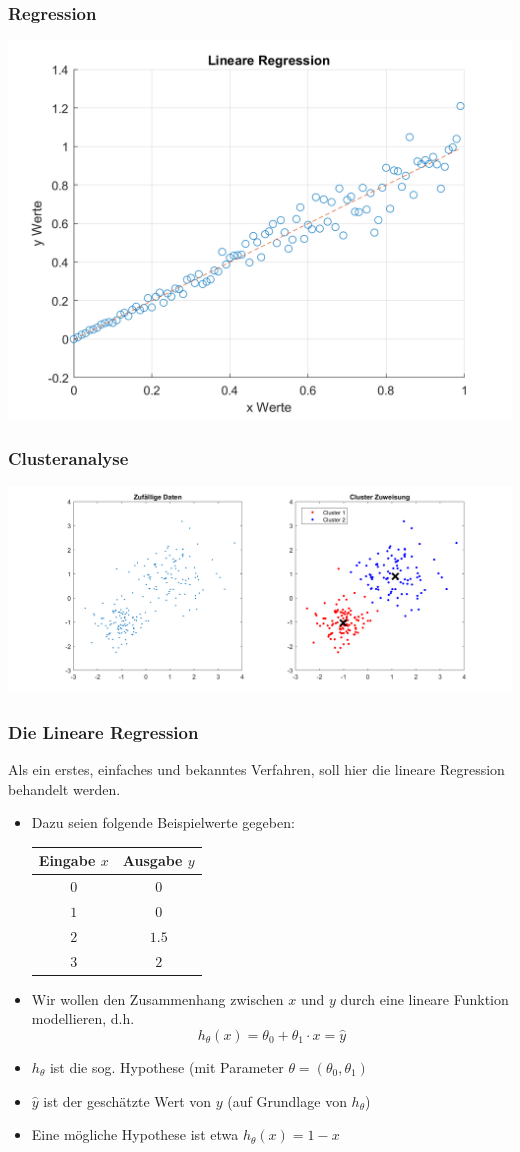 \begin{frame}
\frametitle{Regression}
\centering
\includegraphics[scale=0.31]{images/plot_linreg.png} 
\end{frame}
\begin{frame}
\frametitle{Clusteranalyse}
\includegraphics[scale=0.25]{images/cluster_plot.png} 
\end{frame}
\begin{frame}
\frametitle{Die Lineare Regression}
Als ein erstes, einfaches und bekanntes Verfahren, soll hier die lineare Regression behandelt werden.
\pause
\begin{itemize}[<+->]
\item Dazu seien folgende Beispielwerte gegeben:\\
\begin{tabular}{c|c}
Eingabe $x$ & Ausgabe $y$\\
\hline
$0$ & $0$\\
$1$ & $0$\\
$2$ & $1.5$\\
$3$ & $2$\\
\end{tabular}
\item Wir wollen den Zusammenhang zwischen $x$ und $y$ durch eine lineare Funktion modellieren, d.h.
\[ h_\theta (x) = \theta_0 + \theta_1\cdot x = \hat{y} \]
\item $h_\theta$ ist die sog. Hypothese (mit Parameter $\theta = (\theta_0,\theta_1)$
\item $\hat{y}$ ist der geschätzte Wert von $y$ (auf Grundlage von $h_\theta$)
\item Eine mögliche Hypothese ist etwa $h_\theta(x) = 1 - x$
\end{itemize} 
\end{frame}
